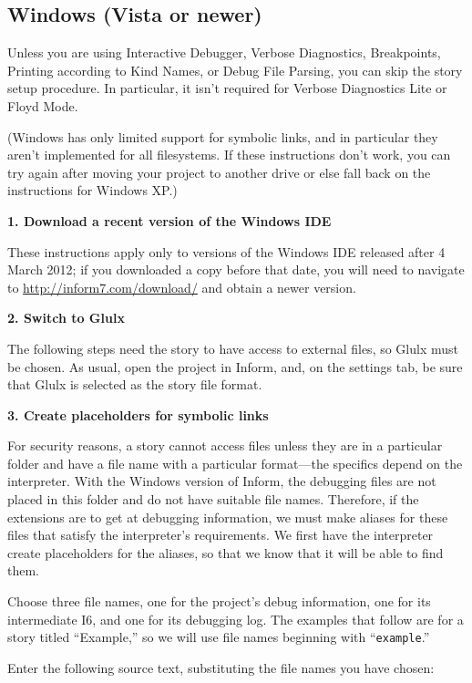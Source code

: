 \documentclass{book}
\newcommand{\lastpagebreak}{\vfill\pagebreak}
\begin{document}
\lastpagebreak

\subsection{Windows (Vista or newer)}

Unless you are using Interactive Debugger, Verbose Diagnostics, Breakpoints,
Printing according to Kind Names, or Debug File Parsing, you can skip the story
setup procedure.  In particular, it isn't required for Verbose Diagnostics Lite
or Floyd Mode.

(Windows has only limited support for symbolic links, and in particular they
aren't implemented for all filesystems.  If these instructions don't work, you
can try again after moving your project to another drive or else fall back on
the instructions for Windows XP.)

\textbf{1. Download a recent version of the Windows IDE}

These instructions apply only to versions of the Windows IDE released after 4
March 2012; if you downloaded a copy before that date, you will need to navigate
to \url{http://inform7.com/download/} and obtain a newer version.

\textbf{2. Switch to Glulx}

The following steps need the story to have access to external files, so Glulx
must be chosen.  As usual, open the project in Inform, and, on the settings tab,
be sure that Glulx is selected as the story file format.

\textbf{3. Create placeholders for symbolic links}

For security reasons, a story cannot access files unless they are in a
particular folder and have a file name with a particular format---the specifics
depend on the interpreter.  With the Windows version of Inform, the debugging
files are not placed in this folder and do not have suitable file names.
Therefore, if the extensions are to get at debugging information, we must make
aliases for these files that satisfy the interpreter's requirements.  We first
have the interpreter create placeholders for the aliases, so that we know that
it will be able to find them.

Choose three file names, one for the project's debug information, one for its
intermediate I6, and one for its debugging log.  The examples that follow are
for a story titled ``Example,'' so we will use file names beginning with
``\texttt{example}.''

Enter the following source text, substituting the file names you have chosen:
\end{document}
